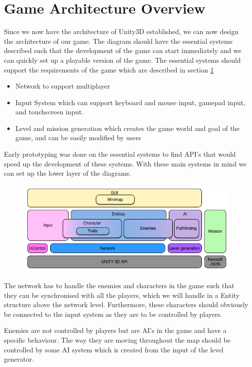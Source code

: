 \section{Game Architecture Overview}
Since we now have the architecture of Unity3D established, we can now design the architecture of our game.
The diagram should have the essential systems described such that the development of the game can start immediately and we can quickly set up a playable version of the game.
The essential systems should support the requirements of the game which are described in section \ref{} 
\begin{itemize}
	\item Network to support multiplayer
	\item Input System which can support keyboard and mouse input, gamepad input, and touchscreen input.
	\item Level and mission generation which creates the game world and goal of the game, and can be easily modified by users
\end{itemize}
Early prototyping was done on the essential systems to find API's that would speed up the development of these systems.
With these main systems in mind we can set up the lower layer of the diagrams.

\begin{figure}
\includegraphics[width = \textwidth]{figures/architecture/game_architecture_overview.png}
\end{figure}

The network has to handle the enemies and characters in the game such that they can be synchronised with all the players, which we will handle in a Entity structure above the network level. 
Furthermore, these characters should obviously be connected to the input system as they are to be controlled by players.

Enemies are not controlled by players but are AI's in the game and have a specific behaviour.
The way they are moving throughout the map should be controlled by some AI system which is created from the input of the level generator.
